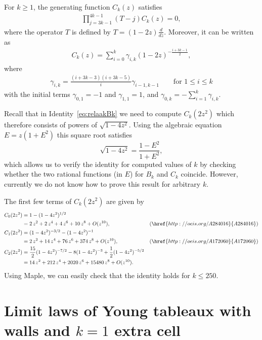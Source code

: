 \documentclass[a4paper,UKenglish,cleveref, autoref, thm-restate]{lipics-v2021}
\newcommand{\oeis}[1]{\href{http://oeis.org/#1}{#1}}
\begin{document}
\begin{proposition}\label{prop:BkODE}
For $k \ge 1$, the generating function $C_k(z)$ satisfies
\begin{align}
\label{eq:barbkopgf}
\prod_{j=3k-1}^{4k-1}(T-j){C}_k(z)=0,   
\end{align}
where the operator $T$ is defined by $T=(1-2z) \frac{d}{dz}$. Moreover, it can be written as
\begin{align}
\label{eq:barbkgf}
{C}_k(z)=\sum_{i=0}^{k} \gamma_{i,k} (1-2z)^{-\frac{i+3k-1}{2}},    
\end{align}
where 
\begin{align*}
\gamma_{i,k} = \frac{(i+3k-3)(i+3k-5)}{i}\gamma_{i-1,k-1} \qquad \text{for $1 \leq i \leq k$}
\end{align*}
with the initial terms $\gamma_{0,1}=-1$ and $\gamma_{1,1}=1$,
and $\gamma_{0,k} = -\sum^{k}_{i=1}\gamma_{i,k}$.
\end{proposition}

Recall that in Identity~\eqref{eq:relaakBk} we need to compute $C_k(2z^2)$ which therefore consists of powers of $\sqrt{1-4z^2}$. Using the algebraic equation $E = z(1+E^2)$ this square root satisfies 
\[
  \sqrt{1-4z^2} = \frac{1-E^2}{1+E^2},
\]
which allows us to verify the identity for computed values of $k$ by checking whether the two rational functions (in $E$) for $B_k$ and $C_k$ coincide.
However, currently we do not know how to prove this result for arbitrary $k$.

The first few terms of $C_k(2z^2)$ are given by
\begin{align*}
	C_0(2z^2) &= 1-(1-4z^2)^{1/2} \\
	       &= 2\,{z}^{2}+2\,{z}^{4}+4\,{z}^{6}+10\,{z}^{8}+O ( {z}^{10}), 
            & (\oeis{A284016})
           \\
	C_1(2z^2) &= (1-4z^2)^{-3/2}-(1-4z^2)^{-1} \\
	       &= 2\,{z}^{2}+14\,{z}^{4}+76\,{z}^{6}+374\,{z}^{8}+O( {z}^{10}),
           & (\oeis{A172060}) 
           \\
	C_2(2z^2) &= \frac{15}{2} (1-4z^2)^{-7/2} - 8 (1-4z^2)^{-3} + \frac{1}{2} (1-4z^2)^{-5/2}\\
	       &= 14\,{z}^{2}+212\,{z}^{4}+2020\,{z}^{6}+15480\,{z}^{8}+O ( {z}^{10}).
\end{align*}
Using Maple, we can easily check that the identity holds for $k \le 250$.

\section{Limit laws of Young tableaux with walls and \texorpdfstring{$k=1$}{k=1} extra cell}
\end{document}
